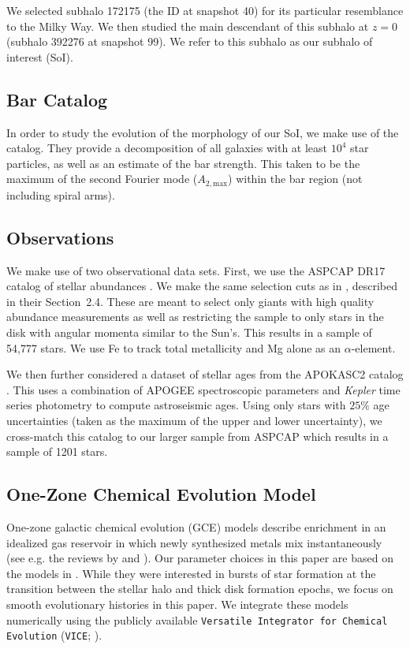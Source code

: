 \documentclass[linenumbers, twocolumn]{aastex631}
\begin{document}
We selected subhalo 172175 (the ID at snapshot 40) for its particular resemblance to the Milky Way. We then studied the main descendant of this subhalo at $z=0$ (subhalo 392276 at snapshot 99). We refer to this subhalo as our subhalo of interest (SoI).

\subsection{Bar Catalog}\label{ssec:barcat}
In order to study the evolution of the morphology of our SoI, we make use of the \citet{2022MNRAS.515.1524Z} catalog. They provide a decomposition of all galaxies with at least $10^4$ star particles, as well as an estimate of the bar strength. This taken to be the maximum of the second Fourier mode ($A_{2,\textrm{max}}$) within the bar region (not including spiral arms).

\subsection{Observations}\label{ssec:obs}
We make use of two observational data sets. First, we use the ASPCAP DR17 catalog of stellar abundances \citep[][J.A.~Holtzman et al., in preparation]{2016AJ....151..144G}. We make the same selection cuts as in \citet{2024arXiv240707985B}, described in their Section~2.4. These are meant to select only giants with high quality abundance measurements as well as restricting the sample to only stars in the disk with angular momenta similar to the Sun's. This results in a sample of 54,777 stars. We use Fe to track total metallicity and Mg alone as an $\alpha$-element.

We then further considered a dataset of stellar ages from the APOKASC2 catalog \citep{2018ApJS..239...32P}. This uses a combination of APOGEE spectroscopic parameters and \textit{Kepler} time series photometry to compute astroseismic ages. Using only stars with $25\%$ age uncertainties (taken as the maximum of the upper and lower uncertainty), we cross-match this catalog to our larger sample from ASPCAP which results in a sample of 1201 stars.

\subsection{One-Zone Chemical Evolution Model}\label{ssec:onezone_met}
One-zone galactic chemical evolution (GCE) models describe enrichment in an idealized gas reservoir in which newly synthesized metals mix instantaneously (see e.g. the reviews by \citealt{Tinsley1980} and \citealt{Matteucci2021}). Our parameter choices in this paper are based on the models in \citet{2022arXiv220402989C}. While they were interested in bursts of star formation at the transition between the stellar halo and thick disk formation epochs, we focus on smooth evolutionary histories in this paper. We integrate these models numerically using the publicly available {\tt Versatile Integrator for Chemical Evolution} ({\tt VICE}; \citealt{Johnson2020}).
\end{document}
